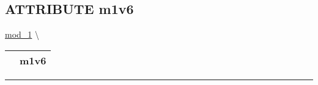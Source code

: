 \subsection*{\textsf{\colorbox{headtoc}{\color{white} ATTRIBUTE}
m1v6}}

\hypertarget{ecldoc:mod_1.m1v6}{}
\hspace{0pt} \hyperlink{ecldoc:mod_1}{mod_1} \textbackslash 

{\renewcommand{\arraystretch}{1.5}
\begin{tabularx}{\textwidth}{|>{\raggedright\arraybackslash}l|X|}
\hline
\hspace{0pt}\mytexttt{\color{red} } & \textbf{m1v6} \\
\hline
\end{tabularx}
}

\par


\rule{\linewidth}{0.5pt}


